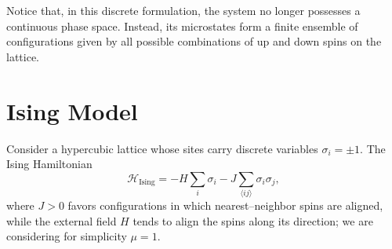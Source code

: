 Notice that, in this discrete formulation, the system no longer possesses a continuous phase space. Instead, its microstates form a finite ensemble of configurations given by all possible combinations of up and down spins on the lattice.

\section{Ising Model}

Consider a hypercubic lattice whose sites carry discrete variables
\(\sigma_i = \pm 1\). The Ising Hamiltonian
\begin{equation}
    \mathcal{H}_{\mathrm{Ising}}
    = - H \sum_i \sigma_i
    - J \sum_{\langle ij \rangle} \sigma_i \sigma_j,
    \label{eq:Ising_Hamiltonian}
\end{equation}
where \(J>0\) favors configurations in which nearest--neighbor spins are aligned, while the external field \(H\) tends to align the spins along its direction; we are considering for simplicity \(\mu = 1\).

